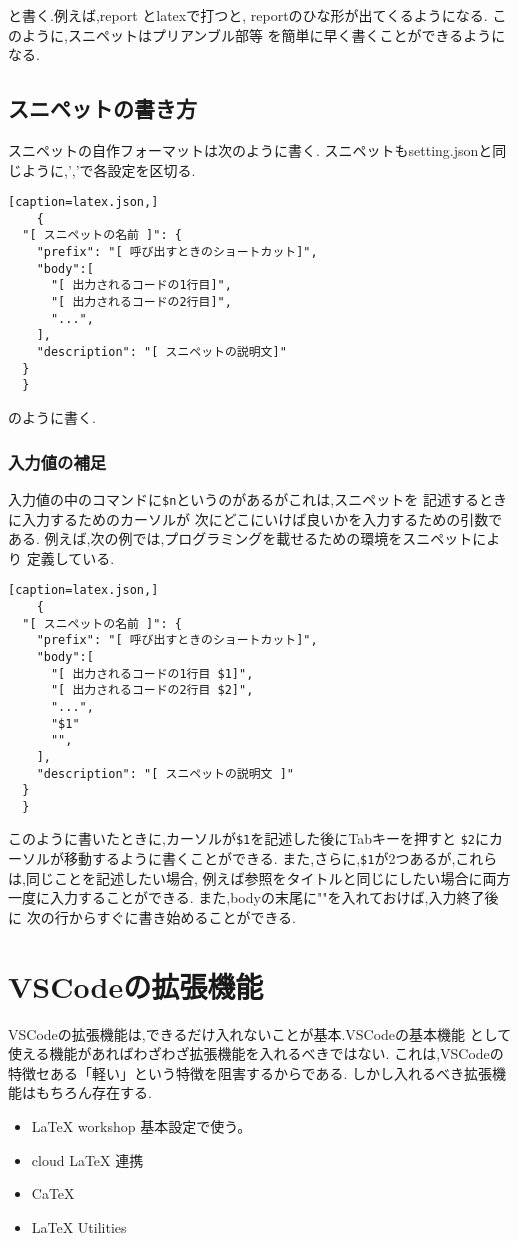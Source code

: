 \documentclass{ltjsarticle}
\begin{document}
と書く.例えば,report とlatexで打つと,
reportのひな形が出てくるようになる.
このように,スニペットはプリアンブル部等
を簡単に早く書くことができるようになる.
\subsection{スニペットの書き方}
スニペットの自作フォーマットは次のように書く.
スニペットもsetting.jsonと同じように,','で各設定を区切る.
\begin{verbatim}[caption=latex.json,]
	{
  "[ スニペットの名前 ]": {
    "prefix": "[ 呼び出すときのショートカット]",
    "body":[
      "[ 出力されるコードの1行目]",
      "[ 出力されるコードの2行目]",
      "...",
    ],
    "description": "[ スニペットの説明文]"
  }
  }
\end{verbatim}
のように書く.
\subsubsection*{入力値の補足}
入力値の中のコマンドに\verb|$n|というのがあるがこれは,スニペットを
記述するときに入力するためのカーソルが
次にどこにいけば良いかを入力するための引数である.
例えば,次の例では,プログラミングを載せるための環境をスニペットにより
定義している.
\begin{verbatim}[caption=latex.json,]
	{
  "[ スニペットの名前 ]": {
    "prefix": "[ 呼び出すときのショートカット]",
    "body":[
      "[ 出力されるコードの1行目 $1]",
      "[ 出力されるコードの2行目 $2]",
      "...",
      "$1"
      "",
    ],
    "description": "[ スニペットの説明文 ]"
  }
  }
\end{verbatim}

このように書いたときに,カーソルが\verb|$1|を記述した後にTabキーを押すと
\verb|$2|にカーソルが移動するように書くことができる.
また,さらに,\verb|$1|が2つあるが,これらは,同じことを記述したい場合,
例えば参照をタイトルと同じにしたい場合に両方一度に入力することができる.
また,bodyの末尾に""を入れておけば,入力終了後に
次の行からすぐに書き始めることができる.


\section{VSCodeの拡張機能}
VSCodeの拡張機能は,できるだけ入れないことが基本.VSCodeの基本機能
として使える機能があればわざわざ拡張機能を入れるべきではない.
これは,VSCodeの特徴セある「軽い」という特徴を阻害するからである.
しかし入れるべき拡張機能はもちろん存在する.
\begin{itemize}
\item LaTeX workshop 基本設定で使う。
\item cloud LaTeX 連携
\item CaTeX
\item LaTeX Utilities
\end{itemize}
\end{document}
